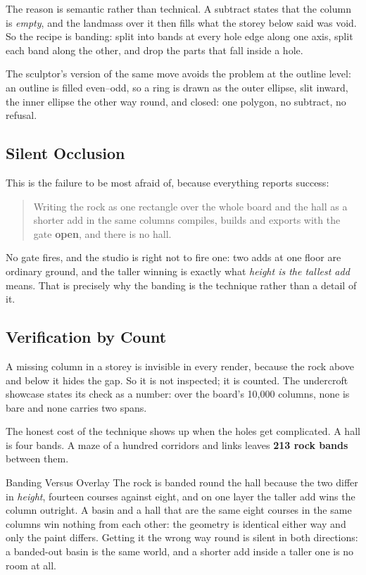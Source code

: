 The reason is semantic rather than technical. A subtract states that the column is
\emph{empty}, and the landmass over it then fills what the storey below said was
void. So the recipe is banding: split into bands at every hole edge along one
axis, split each band along the other, and drop the parts that fall inside a hole.

The sculptor's version of the same move avoids the problem at the outline level:
an outline is filled even--odd, so a ring is drawn as the outer ellipse, slit
inward, the inner ellipse the other way round, and closed: one polygon, no
subtract, no refusal.

\subsection{Silent Occlusion}

This is the failure to be most afraid of, because everything reports success:

\begin{quote}
Writing the rock as one rectangle over the whole board and the hall as a shorter
add in the same columns compiles, builds and exports with the gate \textbf{open},
and there is no hall.
\end{quote}

No gate fires, and the studio is right not to fire one: two adds at one floor are
ordinary ground, and the taller winning is exactly what \emph{height is the tallest
add} means. That is precisely why the banding is the technique rather than a detail
of it.

\subsection{Verification by Count}

A missing column in a storey is invisible in every render, because the rock above
and below it hides the gap. So it is not inspected; it is counted. The undercroft
showcase states its check as a number: over the board's 10,000 columns, none is
bare and none carries two spans.

The honest cost of the technique shows up when the holes get complicated. A hall is
four bands. A maze of a hundred corridors and links leaves \textbf{213 rock bands}
between them.

\begin{ruling}{Banding Versus Overlay}
The rock is banded round the hall because the two differ in \emph{height},
fourteen courses against eight, and on one layer the taller add wins the column
outright. A basin and a hall that are the same eight courses in the same columns
win nothing from each other: the geometry is identical either way and only the
paint differs. Getting it the wrong way round is silent in both directions: a
banded-out basin is the same world, and a shorter add inside a taller one is no
room at all.
\end{ruling}

